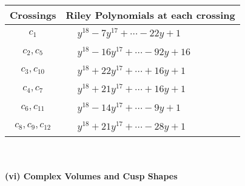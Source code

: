 \documentclass[1p]{elsarticle_modified}
\theoremstyle{definition}
\begin{document}
\begin{tabular}{m{50pt}|m{274pt}}
Crossings & \hspace{64pt}Riley Polynomials at each crossing \\
\hline $$\begin{aligned}c_{1}\end{aligned}$$&$\begin{aligned}
&y^{18}-7 y^{17}+\cdots-22 y+1
\end{aligned}$\\
\hline $$\begin{aligned}c_{2},c_{5}\end{aligned}$$&$\begin{aligned}
&y^{18}-16 y^{17}+\cdots-92 y+16
\end{aligned}$\\
\hline $$\begin{aligned}c_{3},c_{10}\end{aligned}$$&$\begin{aligned}
&y^{18}+22 y^{17}+\cdots+16 y+1
\end{aligned}$\\
\hline $$\begin{aligned}c_{4},c_{7}\end{aligned}$$&$\begin{aligned}
&y^{18}+21 y^{17}+\cdots+16 y+1
\end{aligned}$\\
\hline $$\begin{aligned}c_{6},c_{11}\end{aligned}$$&$\begin{aligned}
&y^{18}-14 y^{17}+\cdots-9 y+1
\end{aligned}$\\
\hline $$\begin{aligned}c_{8},c_{9},c_{12}\end{aligned}$$&$\begin{aligned}
&y^{18}+21 y^{17}+\cdots-28 y+1
\end{aligned}$\\
\hline
\end{tabular}\\~\\
\newpage\flushleft \textbf{(vi) Complex Volumes and Cusp Shapes}
\end{document}
